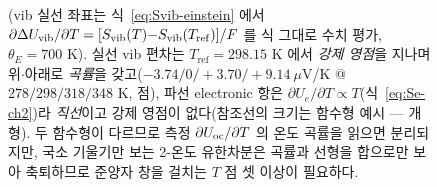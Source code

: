 \begin{figure}[t]
{(vib 실선 좌표는 식~\eqref{eq:Svib-einstein} 에서 $\partial\Delta U_{\mathrm{vib}}/\partial T=[S_{\mathrm{vib}}(T){-}S_{\mathrm{vib}}(T_\mathrm{ref})]/F$
를 식 그대로 수치 평가, $\theta_E{=}700$ K). 실선 vib 편차는 $T_\mathrm{ref}{=}298.15$ K 에서 \emph{강제 영점}을
지나며 위$\cdot$아래로 \emph{곡률}을 갖고($-3.74/0/{+}3.70/{+}9.14~\mu$V/K @ $278/298/318/348$ K, 점),
파선 electronic 항은 $\partial U_e/\partial T\!\propto\!T$(식~\eqref{eq:Se-ch2})라 \emph{직선}이고 강제 영점이
없다(참조선의 크기는 함수형 예시 --- 개형). 두 함수형이 다르므로 측정 $\partial U_{\mathrm{oc}}/\partial T$ 의 온도 곡률을
읽으면 분리되지만, 국소 기울기만 보는 2-온도 유한차분은 곡률과 선형을 합으로만 보아 축퇴하므로 준양자 창을
걸치는 $T$ 점 셋 이상이 필요하다.}
\label{fig:cand-fo2-4}
\end{figure}
